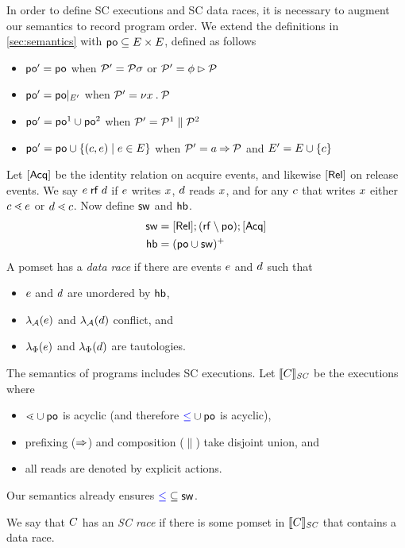In order to define SC executions and SC data races, it is necessary to
augment our semantics to record program order.  We extend the definitions in
\textsection\ref{sec:semantics} with
${\mathrel{\mathsf{po}}}\subseteq{E}\times{E}$, defined as follows
\begin{itemize}
\item
  ${\mathrel{\mathsf{po}}'} = {\mathrel{\mathsf{po}}}$
  when $\mathcal{P}'=\mathcal{P}\sigma$
  or $\mathcal{P}'=\phi\mathbin\rhd\mathcal{P}$
\item
  ${\mathrel{\mathsf{po}}'} = {\mathrel{\mathsf{po}}}\mathbin{|}_{E'}$
  when $\mathcal{P}'=\nu x\mathbin.\mathcal{P}$
\item
  ${\mathrel{\mathsf{po}}'} = {\mathrel{\mathsf{po}}}^1\cup{\ensuremath{\mathrel{\mathsf{po}}}}^2$
  when $\mathcal{P}'=\mathcal{P}^1\parallel\mathcal{P}^2$
\item
  ${\mathrel{\mathsf{po}}'} = {\mathrel{\mathsf{po}}}\cup\{(c,e)\mid e\in E\}$
  when $\mathcal{P}'=a\mathbin\Rightarrow\mathcal{P}$ and $E' = E \cup \{c\}$
\end{itemize}
Let $[\mathsf{Acq}]$ be the identity relation on acquire events, and likewise $[\mathsf{Rel}]$ on release events.
We say $e\mathrel{\mathsf{rf}}d$ if $e$ writes $x$, $d$ reads $x$, and for any $c$ that writes $x$ either $c\lessdot e$ or $d\lessdot c$.
Now define $\mathrel{\mathsf{sw}}$ and $\mathrel{\mathsf{hb}}$.
\begin{align*}
  {\ensuremath{\mathrel{\mathsf{sw}}}} &= [\mathsf{Rel}]; ({\mathrel{\mathsf{rf}}}\setminus{\ensuremath{\mathrel{\mathsf{po}}}}); [\mathsf{Acq}]
  \\
  {\mathrel{\mathsf{hb}}} &= ({\mathrel{\mathsf{po}}} \cup {\ensuremath{\mathrel{\mathsf{sw}}}})^+
\end{align*}
A pomset has a \emph{data race} if there are events
$e$ and $d$ such that 
\begin{itemize}
\item $e$ and $d$ are unordered by $\mathrel{\mathsf{hb}}$,
\item $\lambda_{\mathcal{A}}(e)$ and $\lambda_{\mathcal{A}}(d)$ conflict, and
\item $\lambda_{\Phi}(e)$ and $\lambda_{\Phi}(d)$ are tautologies.
\end{itemize}
The semantics of programs includes SC executions.  Let $\llbracket C\rrbracket_{\textit{SC}}$ be the
executions where
\begin{itemize}
\item ${\lessdot}\cup{\ensuremath{\mathrel{\mathsf{po}}}}$ is acyclic (and therefore ${\mathrel{{\color{blue}\leq}}}\cup{\ensuremath{\mathrel{\mathsf{po}}}}$ is acyclic),
\item prefixing ($\mathbin\Rightarrow$) and composition ($\parallel$) take disjoint union, and
\item all reads are denoted by explicit actions.
\end{itemize}
Our semantics already ensures ${\mathrel{{\color{blue}\leq}}}\subseteq{\ensuremath{\mathrel{\mathsf{sw}}}}$.

We say that $C$ has an \emph{SC race} if there is some pomset in $\llbracket C\rrbracket_{\textit{SC}}$
that contains a data race.

